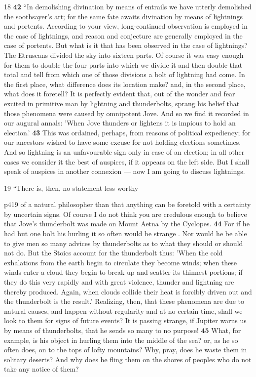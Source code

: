 18
\textbf{42} ``In demolishing divination by means of entrails we have utterly demolished the soothsayer's art; for the same fate awaits divination by means of lightnings and portents. According to your view, long-continued observation is employed in the case of lightnings, and reason and conjecture are generally employed in the case of portents. But what is it that has been observed in the case of lightnings? The Etruscans divided the sky into sixteen parts. Of course it was easy enough for them to double the four parts into which we divide it and then double that total and tell from which one of those divisions a bolt of lightning had come. In the first place, what difference does its location make? and, in the second place, what does it foretell? It is perfectly evident that, out of the wonder and fear excited in primitive man by lightning and thunderbolts, sprang his belief that those phenomena were caused by omnipotent Jove. And so we find it recorded in our augural annals: 'When Jove thunders or lightens it is impious to hold an election.' \textbf{43} This was ordained, perhaps, from reasons of political expediency; for our ancestors wished to have some excuse for not holding elections sometimes. And so lightning is an unfavourable sign only in case of an election; in all other cases we consider it the best of auspices, if it appears on the left side. But I shall speak of auspices in another connexion \texthebrew{—} now I am going to discuss lightnings.

19
``There is, then, no statement less worthy

p419 of a natural philosopher than that anything can be foretold with a certainty by uncertain signs. Of course I do not think you are credulous enough to believe that Jove's thunderbolt was made on Mount Aetna by the Cyclopes. \textbf{44} For if he had but one bolt his hurling it so often would be strange . Nor would he be able to give men so many advices by thunderbolts as to what they should or should not do. But the Stoics account for the thunderbolt thus: 'When the cold exhalations from the earth begin to circulate they become winds; when these winds enter a cloud they begin to break up and scatter its thinnest portions; if they do this very rapidly and with great violence, thunder and lightning are thereby produced. Again, when clouds collide their heat is forcibly driven out and the thunderbolt is the result.' Realizing, then, that these phenomena are due to natural causes, and happen without regularity and at no certain time, shall we look to them for signs of future events? It is passing strange, if Jupiter warns us by means of thunderbolts, that he sends so many to no purpose! \textbf{45} What, for example, is his object in hurling them into the middle of the sea? or, as he so often does, on to the tops of lofty mountains? Why, pray, does he waste them in solitary deserts? And why does he fling them on the shores of peoples who do not take any notice of them?

